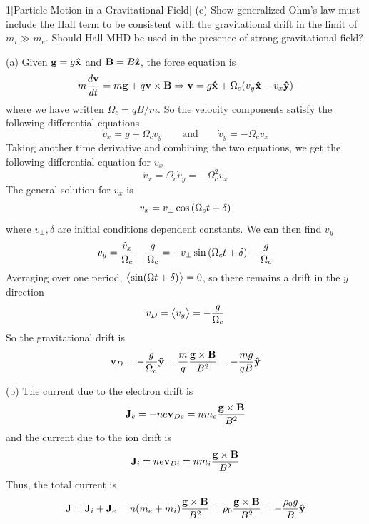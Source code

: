 \documentclass[12pt]{article}
\begin{document}
\begin{problem}{1}[Particle Motion in a Gravitational Field]
(e) Show generalized Ohm's law must include the Hall term to be consistent with
the gravitational drift in the limit of $m_i\gg m_e$. Should Hall MHD be used in
the presence of strong gravitational field?
\begin{solution}
(a) Given $\vb{g}=g\vb{\hat{x}}$ and $\vb{B}=B\vb{\hat{z}}$, the force equation is
\begin{equation}
    m\frac{d\vb{v}}{dt}=m\vb{g}+q\vb{v}\times\vb{B}\Rightarrow
    \vb{v}=g\vb{\hat{x}}+\Omega_c(v_y\vb{\hat{x}}-v_x\vb{\hat{y}})
\end{equation}
where we have written $\Omega_c=qB/m$. So the velocity components satisfy the
following differential equations
\begin{equation}
    \dot{v}_x=g+\Omega_cv_y\qquad\text{and}\qquad
    \dot{v}_y=-\Omega_cv_x
\end{equation}
Taking another time derivative and combining the two equations, we get the
following differential equation for $v_x$
\begin{equation}
    \ddot{v}_x=\Omega_c\dot{v}_y=-\Omega_c^2v_x 
\end{equation}
The general solution for $v_x$ is
\begin{equation}
    v_x=v_\perp \cos\qty(\Omega_ct+\delta)    
\end{equation}
where $v_\perp,\delta$ are initial conditions dependent constants. We can
then find $v_y$
\begin{equation}
    v_y=\frac{\dot{v}_x}{\Omega_c}-\frac{g}{\Omega_c}=
    -v_\perp\sin\qty(\Omega_ct+\delta)-\frac{g}{\Omega_c}
\end{equation}
Averaging over one period, $\expval{\sin(\Omega t+\delta)}=0$, so there remains
a drift in the $y$ direction
\begin{equation}
    v_D=\expval{v_y}=-\frac{g}{\Omega_c} 
\end{equation}
So the gravitational drift is
\begin{equation}\label{p1a:vd}
    \vb{v}_D=-\frac{g}{\Omega_c}\vb{\hat{y}}=\frac{m}{q}\frac{\vb{g}\times\vb{B}}{B^2}
    =-\frac{mg}{qB}\vb{\hat{y}}
\end{equation}

(b) The current due to the electron drift is
\begin{equation}
    \vb{J}_{e}=-ne\vb{v}_{De}=nm_e\frac{\vb{g}\times\vb{B}}{B^2}
\end{equation}
and the current due to the ion drift is
\begin{equation}
    \vb{J}_i=ne\vb{v}_{Di}=nm_i\frac{\vb{g}\times\vb{B}}{B^2} 
\end{equation}
Thus, the total current is
\begin{equation}
    \vb{J}=\vb{J}_i+\vb{J}_e=n(m_e+m_i)\frac{\vb{g}\times\vb{B}}{B^2}
    =\rho_0\frac{\vb{g}\times\vb{B}}{B^2}
    =-\frac{\rho_0g}{B}\vb{\hat{y}}
\end{equation}


\end{solution}
\end{problem}
\end{document}
